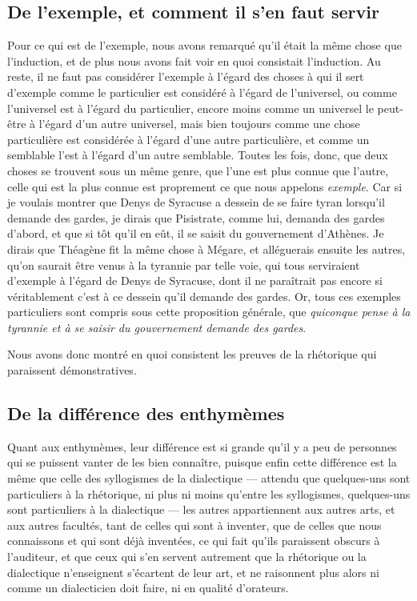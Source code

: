 \subsection{De l'exemple, et comment il s'en faut servir}

Pour ce qui est de l'exemple, nous avons remarqué qu'il était la même chose que l'induction, et de plus nous avons fait voir en quoi consistait l'induction.
Au reste, il ne faut pas considérer l'exemple à l'égard des choses à qui il sert d'exemple comme le particulier est considéré à l'égard de l'universel, ou
comme l'universel est à l'égard du particulier, encore moins comme un universel le peut-être à l'égard d'un autre universel, mais bien toujours comme une chose
particulière est considérée à l'égard d'une autre particulière, et comme un semblable l'est à l'égard d'un autre semblable. Toutes les fois, donc, que deux
choses se trouvent sous un même genre, que l'une est plus connue que l'autre, celle qui est la plus connue est proprement ce que nous appelons \emph{exemple}.
Car si je voulais montrer que Denys de Syracuse a dessein de se faire tyran lorsqu'il demande des gardes, je dirais que Pisistrate, comme lui, demanda des gardes
d'abord, et que si tôt qu'il en eût, il se saisit du gouvernement d'Athènes. Je dirais que Théagène fit la même chose à Mégare, et alléguerais ensuite les autres,
qu'on saurait être venus à la tyrannie par telle voie, qui tous serviraient d'exemple à l'égard de Denys de Syracuse, dont il ne paraîtrait pas encore si véritablement
c'est à ce dessein qu'il demande des gardes. Or, tous ces exemples particuliers sont compris sous cette proposition générale, que \emph{quiconque pense à la tyrannie
et à se saisir du gouvernement demande des gardes}.

Nous avons donc montré en quoi consistent les preuves de la rhétorique qui paraissent démonstratives.

\subsection{De la différence des enthymèmes}

Quant aux enthymèmes, leur différence est si grande qu'il y a peu de personnes qui se puissent vanter de les bien connaître, puisque enfin cette
différence est la même que celle des syllogismes de la dialectique --- attendu que quelques-uns sont particuliers à la rhétorique, ni plus ni moins
qu'entre les syllogismes, quelques-uns sont particuliers à la dialectique --- les autres appartiennent aux autres arts, et aux autres facultés, tant
de celles qui sont à inventer, que de celles que nous connaissons et qui sont déjà inventées, ce qui fait qu'ils paraissent obscurs à l'auditeur, et
que ceux qui s'en servent autrement que la rhétorique ou la dialectique n'enseignent s'écartent de leur art, et ne raisonnent plus alors ni comme un
dialecticien doit faire, ni en qualité d'orateurs.


